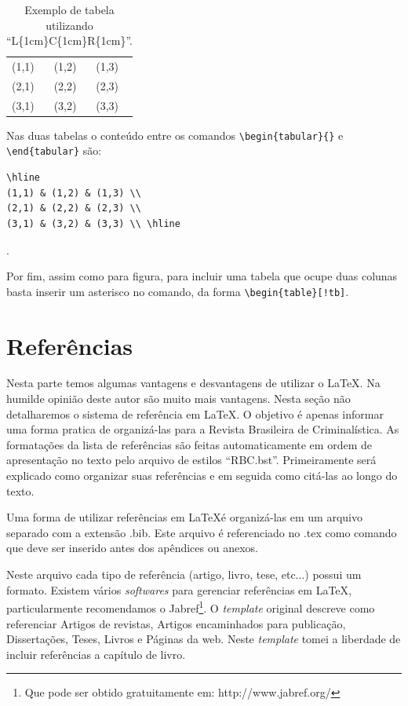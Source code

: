 \documentclass{RBClatex}
\begin{document}
\begin{table}[!htb]
	\centering
	\caption{Exemplo de tabela utilizando ``L\{1cm\}C\{1cm\}R\{1cm\}''.}
	\label{Tab:Exemplo2}
	\begin{tabular}{|L{1cm}C{1cm}R{1cm}|}
		\hline
		(1,1) & (1,2) & (1,3) \\
		(2,1) & (2,2) & (2,3) \\
		(3,1) & (3,2) & (3,3) \\ \hline
	\end{tabular}
\end{table}

Nas duas tabelas o conteúdo entre os comandos \verb|\begin{tabular}{}| e \verb|\end{tabular}| são:
\begin{lstlisting}
\hline
(1,1) & (1,2) & (1,3) \\
(2,1) & (2,2) & (2,3) \\
(3,1) & (3,2) & (3,3) \\ \hline
\end{lstlisting}.

Por fim, assim como para figura, para incluir uma tabela que ocupe duas colunas basta inserir um asterisco no comando, da forma \verb|\begin{table}[!tb]|. 

\section{Referências}

Nesta parte temos algumas vantagens e desvantagens de utilizar o \LaTeX. Na humilde opinião deste autor são muito mais vantagens. Nesta seção não detalharemos o sistema de referência em \LaTeX. O objetivo é apenas informar uma forma pratica de organizá-las para a Revista Brasileira de Criminalística. As formatações da lista de referências são feitas automaticamente em ordem de apresentação no texto pelo arquivo de estilos ``RBC.bst''. Primeiramente será explicado como organizar suas referências e em seguida como citá-las ao longo do texto.

Uma forma de utilizar referências em \LaTeX é organizá-las em um arquivo separado com a extensão .bib. Este arquivo é referenciado no .tex como comando \verb|| que deve ser inserido antes dos apêndices ou anexos.

Neste arquivo cada tipo de referência (artigo, livro, tese, etc...) possui um formato. Existem vários \textit{softwares} para gerenciar referências em \LaTeX, particularmente recomendamos o Jabref\footnote{Que pode ser obtido gratuitamente em: http://www.jabref.org/}. O \textit{template} original descreve como referenciar Artigos de revistas, Artigos encaminhados para publicação, Dissertações, Teses, Livros e Páginas da web. Neste \textit{template} tomei a liberdade de incluir referências a capítulo de livro. %
\end{document}

